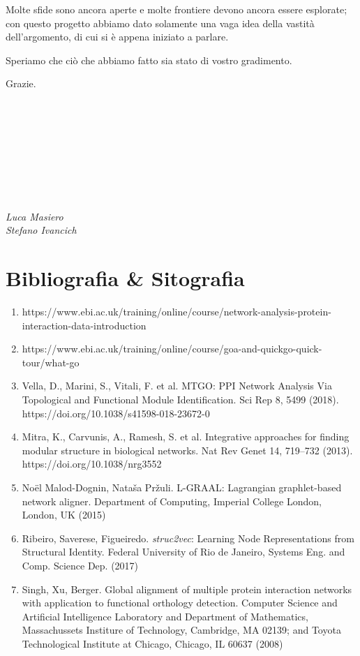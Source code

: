 \documentclass[11pt]{article}
\begin{document}
Molte sfide sono ancora aperte e molte frontiere devono ancora essere esplorate; con questo progetto abbiamo dato solamente una vaga idea della vastità dell'argomento, di cui si è appena iniziato a parlare. 

Speriamo che ciò che abbiamo fatto sia stato di vostro gradimento.

Grazie.
\\
\\
\\
\\
\\
\\
\\
\\
\\
\begin{flushright}
\textit{Luca Masiero}\\
\textit{Stefano Ivancich}
\end{flushright}

\pagebreak 
\section{Bibliografia \& Sitografia} 
\begin{enumerate}
\item https://www.ebi.ac.uk/training/online/course/network-analysis-protein-interaction-data-introduction

\item https://www.ebi.ac.uk/training/online/course/goa-and-quickgo-quick-tour/what-go

\item Vella, D., Marini, S., Vitali, F. et al. MTGO: PPI Network Analysis Via Topological and Functional Module Identification. Sci Rep 8, 5499 (2018). https://doi.org/10.1038/s41598-018-23672-0

\item Mitra, K., Carvunis, A., Ramesh, S. et al. Integrative approaches for finding modular structure in biological networks. Nat Rev Genet 14, 719–732 (2013). https://doi.org/10.1038/nrg3552

\item No\"el Malod-Dognin, Nata\v{s}a Pr\v{z}uli. L-GRAAL: Lagrangian graphlet-based network aligner. Department of Computing, Imperial College London, London, UK (2015)

\item Ribeiro, Saverese, Figueiredo. \textit{struc2vec}: Learning Node Representations from Structural Identity. Federal University of Rio de Janeiro, Systems Eng. and Comp. Science Dep. (2017)

\item Singh, Xu, Berger. Global alignment of multiple protein interaction networks with application to functional orthology detection. Computer Science and Artificial Intelligence Laboratory and Department of Mathematics, Massachussets Institure of Technology, Cambridge, MA 02139; and Toyota Technological Institute at Chicago, Chicago, IL 60637 (2008)

\end{enumerate}
\end{document}
